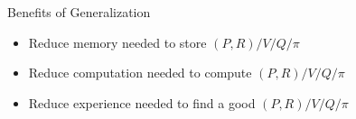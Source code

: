 \begin{frame}[c]{Benefits of Generalization}
	
	\begin{itemize}
		\item Reduce memory needed to store $(P,R) / V / Q / \pi$
		\item Reduce computation needed to compute $(P,R) / V / Q / \pi$
		\item Reduce experience needed to find a good $(P,R) / V / Q / \pi$
	\end{itemize}
	
\end{frame}

